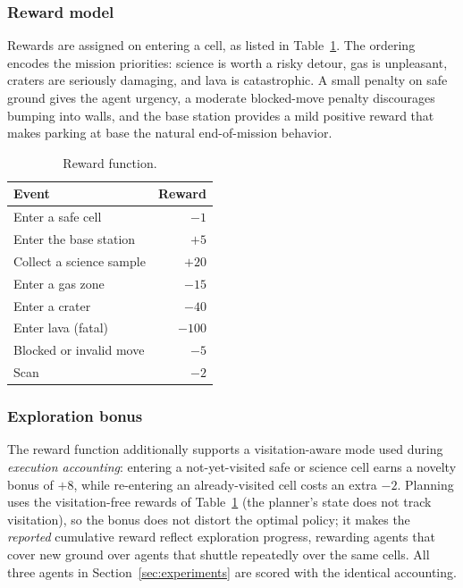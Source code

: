 \documentclass[conference]{IEEEtran}
\begin{document}
\subsubsection{Reward model} Rewards are assigned on entering a cell, as listed in Table~\ref{tab:rewards}. The ordering encodes the mission priorities: science is worth a risky detour, gas is unpleasant, craters are seriously damaging, and lava is catastrophic. A small penalty on safe ground gives the agent urgency, a moderate blocked-move penalty discourages bumping into walls, and the base station provides a mild positive reward that makes parking at base the natural end-of-mission behavior.

\begin{table}[t]
  \caption{Reward function.}
  \label{tab:rewards}
  \centering
  \begin{tabular}{lr}
    \toprule
    Event & Reward \\
    \midrule
    Enter a safe cell        & $-1$   \\
    Enter the base station   & $+5$   \\
    Collect a science sample & $+20$  \\
    Enter a gas zone         & $-15$  \\
    Enter a crater           & $-40$  \\
    Enter lava (fatal)       & $-100$ \\
    Blocked or invalid move  & $-5$   \\
    Scan                     & $-2$   \\
    \bottomrule
  \end{tabular}
\end{table}

\subsubsection{Exploration bonus} The reward function additionally supports a visitation-aware mode used during \emph{execution accounting}: entering a not-yet-visited safe or science cell earns a novelty bonus of $+8$, while re-entering an already-visited cell costs an extra $-2$. Planning uses the visitation-free rewards of Table~\ref{tab:rewards} (the planner's state does not track visitation), so the bonus does not distort the optimal policy; it makes the \emph{reported} cumulative reward reflect exploration progress, rewarding agents that cover new ground over agents that shuttle repeatedly over the same cells. All three agents in Section~\ref{sec:experiments} are scored with the identical accounting.
\end{document}
